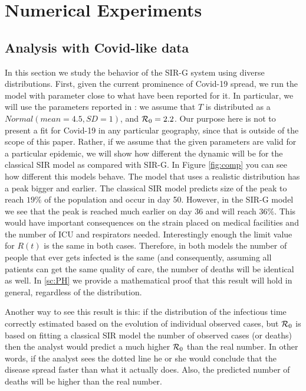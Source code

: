 \documentclass[twoside,USenglish,10pt]{article}
\newcommand{\Ro}{\ensuremath\mathcal{R}_0\xspace}
\begin{document}
\section{Numerical Experiments}\label{sc:numerical}

\subsection{Analysis with Covid-like data}

In this section we study the behavior of the SIR-G system using diverse distributions.
First, given the current prominence of Covid-19 spread, we run the model with parameter close to what have been reported for it. In particular, we will use the parameters reported in \cite{lour.ea20}: we assume that $T$ is distributed as a $Normal(mean=4.5, SD=1)$, and $\Ro=2.2$. Our purpose here is not to present a fit for Covid-19 in any particular geography, since that is outside of the scope of this paper. Rather, if we assume that the given parameters are valid for a particular epidemic, we will show how different the dynamic will be for the classical SIR model as compared with SIR-G. In Figure \ref{fig:comp} you can see how different this models behave. The model that uses a realistic distribution has a peak bigger and earlier. The classical SIR model predicts size of the peak to reach $19\%$ of the population and occur in day 50. However, in the SIR-G model we see that the peak is reached much earlier on day 36 and will reach $36\%$. This would have important consequences on the strain placed on medical facilities and the number of ICU and respirators needed.  Interestingly enough the limit value for $R(t)$ is the same in both cases. Therefore, in both models the number of people that ever gets infected is the same (and consequently, assuming all patients can get the same quality of care, the number of deaths will be identical as well. In \ref{sc:PH} we provide a mathematical proof that this result will hold in general, regardless of the distribution.

Another way to see this result is this: if the distribution of the infectious time correctly estimated based on the evolution of individual observed cases, but $\Ro$ is based on fitting a classical SIR model the number of observed cases (or deaths) then the analyst would predict a much higher $\Ro$ than the real number. In other words, if the analyst sees the dotted line he or she would conclude that the disease spread faster than what it actually does. Also, the predicted number of deaths will be higher than the real number.
\end{document}
